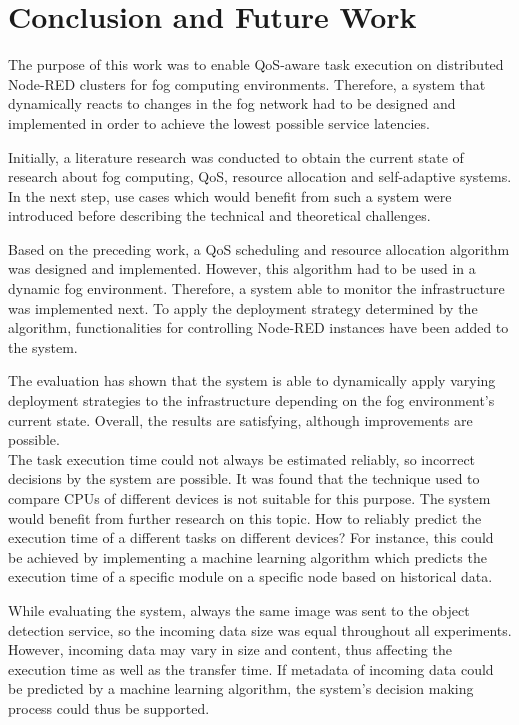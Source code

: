 \chapter{Conclusion and Future Work}

The purpose of this work was to enable QoS-aware task execution on distributed Node-RED clusters for fog computing environments.
Therefore, a system that dynamically reacts to changes in the fog network had to be designed and implemented in order to achieve the lowest possible service latencies.

Initially, a literature research was conducted to obtain the current state of research about fog computing, QoS, resource allocation and self-adaptive systems.
In the next step, use cases which would benefit from such a system were introduced before describing the technical and theoretical challenges.

Based on the preceding work, a QoS scheduling and resource allocation algorithm was designed and implemented.
However, this algorithm had to be used in a dynamic fog environment.
Therefore, a system able to monitor the infrastructure was implemented next.
To apply the deployment strategy determined by the algorithm, functionalities for controlling Node-RED instances have been added to the system.

The evaluation has shown that the system is able to dynamically apply varying deployment strategies to the infrastructure depending on the fog environment's current state.
Overall, the results are satisfying, although improvements are possible.\\


The task execution time could not always be estimated reliably, so incorrect decisions by the system are possible.
It was found that the technique used to compare CPUs of different devices is not suitable for this purpose.
The system would benefit from further research on this topic.
How to reliably predict the execution time of a different tasks on different devices?
For instance, this could be achieved by implementing a machine learning algorithm which predicts the execution time of a specific module on a specific node based on historical data.

While evaluating the system, always the same image was sent to the object detection service, so the incoming data size was equal throughout all experiments.
However, incoming data may vary in size and content, thus affecting the execution time as well as the transfer time.
If metadata of incoming data could be predicted by a machine learning algorithm, the system's decision making process could thus be supported.


